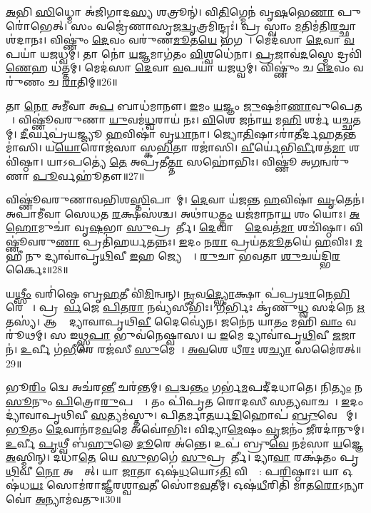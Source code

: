 \ul{𑌅}𑌭𑌿 \ul{𑌸𑌿}𑌧𑍍𑌮𑍋 𑌅॑𑌜𑌿𑌗𑌾𑌦\ul{𑌸𑍍𑌯} 𑌶𑌤𑍍𑌰𑍂𑌨𑍍॑।
𑌵𑌿\ul{𑌤𑌿}𑌗𑍍𑌮𑍇𑌨॑ 𑌵𑍃\ul{𑌷}𑌭𑍇\ul{𑌣𑌾} 𑌪𑍁𑌰𑍋॑𑌭𑍇𑌤𑍍।
𑌸𑌂 𑌵𑌜𑍍𑌰𑍇॑𑌣𑌾𑌸𑍃𑌜\ul{𑌦𑍍𑌵𑍃}𑌤𑍍𑌰𑌮𑌿𑌨𑍍𑌦𑍍𑌰𑌃॑।
𑌪𑍍𑌰 𑌸𑍍𑌵𑌾𑌂 \ul{𑌮}𑌤𑌿𑌮॑𑌤𑌿\ul{𑌰}𑌚𑍍𑌛𑌾𑌶॑𑌦𑌾𑌨𑌃।
𑌵𑌿𑌷𑍍𑌣𑍁𑌂॑ \ul{𑌦𑍇}𑌵𑌂 𑌵𑌰𑍁॑𑌣\ul{𑌮𑍂}𑌤\ul{𑌯𑍇} 𑌭𑌗𑌮𑍍᳚।
𑌮𑍇𑌦॑𑌸𑌾 \ul{𑌦𑍇}𑌵𑌾 \ul{𑌵}𑌪𑌯𑌾॑ 𑌯𑌜𑌧𑍍𑌵𑌮𑍍।
𑌤𑌾 𑌨𑍋॑ \ul{𑌯}𑌜𑍍𑌞𑌮𑌾𑌗॑𑌤𑌂 \ul{𑌵𑌿}𑌶𑍍𑌵𑌧𑍇॑𑌨𑌾।
\ul{𑌪𑍍𑌰}𑌜𑌾𑌵॑\ul{𑌦}𑌸𑍍𑌮𑍇 𑌦𑍍𑌰𑌵𑌿॑\ul{𑌣𑍇}𑌹 𑌧॑𑌤𑍍𑌤𑌮𑍍।
𑌮𑍇𑌦॑𑌸𑌾 \ul{𑌦𑍇}𑌵𑌾 \ul{𑌵}𑌪𑌯𑌾॑ 𑌯𑌜𑌧𑍍𑌵𑌮𑍍।
𑌵𑌿𑌷𑍍𑌣𑍁𑌂॑ 𑌚 \ul{𑌦𑍇}𑌵𑌂 𑌵𑌰𑍁॑𑌣𑌂 𑌚 \ul{𑌰𑌾}𑌤𑌿𑌮𑍍॥26॥

𑌤𑌾 \ul{𑌨𑍋} 𑌅𑌮𑍀॑𑌵𑌾 𑌅\ul{𑌪} 𑌬𑌾𑌧॑𑌮𑌾𑌨𑍗।
\ul{𑌇}𑌮𑌂 \ul{𑌯}𑌜𑍍𑌞𑌂 \ul{𑌜𑍁}𑌷𑌮𑌾॑\ul{𑌣𑌾}𑌵𑍁𑌪𑍇𑌤𑌮𑍍᳚।
𑌵𑌿𑌷𑍍𑌣𑍂॑𑌵𑌰𑍁𑌣𑌾 \ul{𑌯𑍁}𑌵𑌮॑\ul{𑌧𑍍𑌵}𑌰𑌾𑌯॑ 𑌨𑌃।
\ul{𑌵𑌿}𑌶𑍇 𑌜𑌨𑌾॑\ul{𑌯} 𑌮\ul{𑌹𑌿} 𑌶𑌰𑍍𑌮॑ 𑌯𑌚𑍍𑌛𑌤𑌮𑍍।
\ul{𑌦𑍀}𑌰𑍍𑌘𑌪𑍍𑌰॑𑌯𑌜𑍍𑌜𑍍𑌯𑍂 \ul{𑌹}𑌵𑌿𑌷𑌾॑ 𑌵𑍃\ul{𑌧𑌾}𑌨𑌾।
𑌜𑍍𑌯𑍋\ul{𑌤𑌿}𑌷𑌾\-𑌽𑌰𑌾॑𑌤𑍀𑌰𑍍𑌦𑌹\-\ul{𑌤}𑌨𑍍𑌤𑌮𑌾॑𑌸𑌿।
𑌯\ul{𑌯𑍋}𑌰𑍋𑌜॑𑌸𑌾 𑌸𑍍𑌕\ul{𑌭𑌿}𑌤𑌾 𑌰𑌜𑌾॑𑌸𑌿।
\ul{𑌵𑍀}𑌰𑍍𑌯𑍇॑𑌭𑌿\ul{𑌰𑍍𑌵𑍀}𑌰𑌤॑\ul{𑌮𑌾} 𑌶𑌵𑌿॑𑌷𑍍𑌠𑌾।
𑌯𑌾𑌽𑌪𑌤𑍍𑌯𑍇॑ \ul{𑌤𑍇} 𑌅𑌪𑍍𑌰॑𑌤𑍀\ul{𑌤𑍍𑌤𑌾} 𑌸𑌹𑍋॑𑌭𑌿𑌃।
𑌵𑌿𑌷𑍍𑌣𑍂॑ 𑌅\ul{𑌗}𑌨𑍍𑌵𑌰𑍁॑𑌣𑌾 \ul{𑌪𑍂}𑌰𑍍𑌵𑌹𑍂॑𑌤𑍗॥27॥

𑌵𑌿𑌷𑍍𑌣𑍂॑𑌵𑌰𑍁𑌣𑌾𑌵𑌭𑌿𑌶\ul{𑌸𑍍𑌤𑌿}𑌪𑌾𑌵𑌾᳚𑌮𑍍।
\ul{𑌦𑍇}𑌵𑌾 𑌯॑𑌜𑌨𑍍𑌤 \ul{𑌹}𑌵𑌿𑌷𑌾॑ \ul{𑌘𑍃}𑌤𑍇𑌨॑।
𑌅𑌪𑌾𑌮𑍀॑𑌵𑌾 𑌸𑍇𑌧𑌤 \ul{𑌰}𑌕𑍍𑌷𑌸॑𑌶𑍍𑌚।
𑌅𑌥𑌾॑𑌧\ul{𑌤𑍍𑌤𑌂} 𑌯𑌜॑𑌮𑌾𑌨𑌾\ul{𑌯} 𑌶𑌂 𑌯𑍋𑌃।
\ul{𑌅}\ul{}\ul{𑌹𑍋}𑌮𑍁𑌚𑌾॑ 𑌵𑍃\ul{𑌷}𑌭𑌾 \ul{𑌸𑍁}𑌪𑍍𑌰𑌤𑍂᳚𑌰𑍍𑌤𑍀।
\ul{𑌦𑍇}𑌵𑌾𑌨𑌾𑌂᳚ \ul{𑌦𑍇}𑌵𑌤॑\ul{𑌮𑌾} 𑌶𑌚𑌿॑𑌷𑍍𑌠𑌾।
𑌵𑌿𑌷𑍍𑌣𑍂॑𑌵𑌰𑍁\ul{𑌣𑌾} 𑌪𑍍𑌰𑌤𑌿॑\-𑌹𑌰𑍍𑌯𑌤𑌨𑍍𑌨𑌃।
\ul{𑌇}𑌦𑌂 𑌨\ul{𑌰𑌾} 𑌪𑍍𑌰𑌯॑𑌤\ul{𑌮𑍂}𑌤𑌯𑍇॑ \ul{𑌹}𑌵𑌿𑌃।
\ul{𑌮}𑌹𑍀 𑌨𑍁 𑌦𑍍𑌯𑌾𑌵𑌾॑𑌪𑍃\ul{𑌥𑌿}𑌵𑍀 \ul{𑌇}𑌹 𑌜𑍍𑌯𑍇𑌷𑍍𑌠𑍇᳚।
\ul{𑌰𑍁}𑌚𑌾 𑌭॑𑌵𑌤𑌾 \ul{𑌶𑍁}𑌚𑌯॑𑌦𑍍𑌭𑌿\ul{𑌰}𑌰𑍍𑌕𑍈𑌃॥28॥

𑌯\ul{𑌥𑍍𑌸𑍀𑌂} 𑌵𑌰𑌿॑𑌷𑍍𑌠𑍇 𑌬𑍃\ul{𑌹}𑌤𑍀 𑌵𑌿॑\ul{𑌮𑌿}𑌨𑍍𑌵𑌨𑍍।
\ul{𑌨𑍃}𑌵\ul{𑌦𑍍𑌭𑍍𑌯𑍋}𑌕𑍍𑌷𑌾 𑌪॑𑌪𑍍𑌰\ul{𑌥𑌾}𑌨𑍇\ul{𑌭𑌿}𑌰𑍇𑌵𑍈𑌃᳚।
𑌪𑍍𑌰𑌪𑍂᳚\ul{𑌰𑍍𑌵}𑌜𑍇 \ul{𑌪𑌿}𑌤\ul{𑌰𑌾} 𑌨𑌵𑍍𑌯॑𑌸𑍀𑌭𑌿𑌃।
\ul{𑌗𑍀}𑌰𑍍𑌭𑌿𑌃 𑌕𑍃॑𑌣𑍁\ul{𑌧𑍍𑌵}\ul{} 𑌸𑌦॑𑌨𑍇 \ul{𑌋}𑌤𑌸𑍍𑌯॑।
𑌆 𑌨𑍋᳚ 𑌦𑍍𑌯𑌾𑌵𑌾𑌪𑍃𑌥𑌿\ul{𑌵𑍀} 𑌦𑍈𑌵𑍍𑌯𑍇॑𑌨।
𑌜𑌨𑍇॑𑌨 𑌯𑌾\ul{𑌤𑌂} 𑌮𑌹𑌿॑ \ul{𑌵𑌾𑌂} 𑌵𑌰𑍂॑𑌥𑌮𑍍।
𑌸 𑌇𑌥𑍍𑌸𑍍𑌵\ul{𑌪𑌾} 𑌭𑍁𑌵॑𑌨𑍇𑌷𑍍𑌵𑌾𑌸।
𑌯 \ul{𑌇}𑌮𑍇 𑌦𑍍𑌯𑌾𑌵𑌾॑𑌪𑍃\ul{𑌥𑌿}𑌵𑍀 \ul{𑌜}𑌜𑌾𑌨॑।
\ul{𑌉}𑌰𑍍𑌵𑍀 𑌗॑\ul{𑌭𑍀}𑌰𑍇 𑌰𑌜॑𑌸𑍀 \ul{𑌸𑍁}𑌮𑍇𑌕𑍇᳚।
\ul{𑌅}\ul{𑌵}\ul{}𑌶𑍇 𑌧𑍀\ul{𑌰𑌃} 𑌶\ul{𑌚𑍍𑌯𑌾} 𑌸𑌮𑍈॑𑌰𑌤𑍍॥29॥

𑌭𑍂\ul{𑌰𑌿𑌂} 𑌦𑍍𑌵𑍇 𑌅𑌚॑𑌰\ul{𑌨𑍍𑌤𑍀} 𑌚𑌰॑𑌨𑍍𑌤𑌮𑍍।
\ul{𑌪}𑌦𑍍𑌵\ul{𑌨𑍍𑌤𑌂} 𑌗𑌰𑍍𑌭॑\ul{𑌮}𑌪𑌦𑍀॑𑌦𑌧𑌾𑌤𑍇।
𑌨𑌿\ul{𑌤𑍍𑌯𑌂} 𑌨 \ul{𑌸𑍂}𑌨𑍁𑌂 \ul{𑌪𑌿}𑌤𑍍𑌰𑍋\ul{𑌰𑍁}𑌪𑌸𑍍𑌥𑍇᳚।
𑌤𑌂 𑌪𑌿॑𑌪𑍃𑌤 𑌰𑍋𑌦𑌸𑍀 𑌸\ul{𑌤𑍍𑌯}𑌵𑌾𑌚𑌮𑍍᳚।
\ul{𑌇}𑌦𑌂 𑌦𑍍𑌯𑌾॑𑌵𑌾𑌪𑍃𑌥𑌿𑌵𑍀 \ul{𑌸}𑌤𑍍𑌯𑌮॑𑌸𑍍𑌤𑍁।
𑌪𑌿\ul{𑌤}𑌰𑍍𑌮𑌾\ul{𑌤}𑌰𑍍𑌯\ul{𑌦𑌿}𑌹𑍋𑌪॑ \ul{𑌬𑍍𑌰𑍁}𑌵𑍇 𑌵𑌾᳚𑌮𑍍।
\ul{𑌭𑍂}𑌤𑌂 \ul{𑌦𑍇}𑌵𑌾𑌨𑌾॑𑌮\ul{𑌵}𑌮𑍇 𑌅𑌵𑍋॑𑌭𑌿𑌃।
𑌵𑌿𑌦𑍍𑌯𑌾\ul{𑌮𑍇}𑌷𑌂 \ul{𑌵𑍃}𑌜𑌨𑌂॑ \ul{𑌜𑍀}𑌰𑌦𑌾॑𑌨𑍁𑌮𑍍।
\ul{𑌉}𑌰𑍍𑌵𑍀 \ul{𑌪𑍃}𑌥𑍍𑌵𑍀 𑌬॑\ul{𑌹𑍁}𑌲𑍇 \ul{𑌦𑍂}𑌰𑍇 𑌅॑𑌨𑍍𑌤𑍇।
𑌉𑌪॑ 𑌬𑍍𑌰𑍁\ul{𑌵𑍇} 𑌨𑌮॑𑌸𑌾 \ul{𑌯}𑌜𑍍𑌞𑍇 \ul{𑌅}𑌸𑍍𑌮𑌿𑌨𑍍।
𑌦𑌧𑌾॑\ul{𑌤𑍇} 𑌯𑍇 \ul{𑌸𑍁}𑌭𑌗𑍇॑ \ul{𑌸𑍁}𑌪𑍍𑌰𑌤𑍂᳚𑌰𑍍𑌤𑍀।
𑌦𑍍𑌯𑌾\ul{𑌵𑌾} 𑌰𑌕𑍍𑌷॑𑌤𑌂 𑌪𑍃\ul{𑌥𑌿}𑌵𑍀 \ul{𑌨𑍋} 𑌅𑌭𑍍𑌵𑌾᳚𑌤𑍍।
𑌯𑌾 \ul{𑌜𑌾}𑌤𑌾 𑌓𑌷॑\ul{𑌧}𑌯𑍋𑌽\ul{𑌤𑌿} 𑌵𑌿𑌶𑍍𑌵𑌾᳚: 𑌪\ul{𑌰𑌿}𑌷𑍍𑌠𑌾𑌃।
𑌯𑌾 𑌓𑌷॑𑌧\ul{𑌯𑌃} 𑌸𑍋𑌮॑𑌰𑌾𑌜𑍍𑌞𑍀𑌰𑌶𑍍𑌵𑌾\ul{𑌵}𑌤𑍀 𑌸𑍋॑𑌮\ul{𑌵}𑌤𑍀𑌮𑍍।
𑌓𑌷॑\ul{𑌧𑍀}𑌰𑌿𑌤𑌿॑ 𑌮𑌾𑌤\ul{𑌰𑍋}\-𑌽𑌨𑍍𑌯𑌾 𑌵𑍋॑ \ul{𑌅}𑌨𑍍𑌯𑌾𑌮॑𑌵𑌤𑍁॥30॥\anuvakamend[\ul{𑌹}𑌵𑌿𑌰𑍍𑌨𑍋॑ 𑌦𑌾𑌦𑍍𑌭𑌭𑍂𑌵 \ul{𑌰𑌾}𑌤𑌿𑌂 \ul{𑌪𑍂}𑌰𑍍𑌵𑌹𑍂॑𑌤𑌾\ul{𑌵}𑌰𑍍𑌕𑍈𑌰𑍈॑𑌰\ul{𑌦}𑌸𑍍𑌮𑌿𑌨𑍍𑌪𑌞𑍍𑌚॑ 𑌚]

